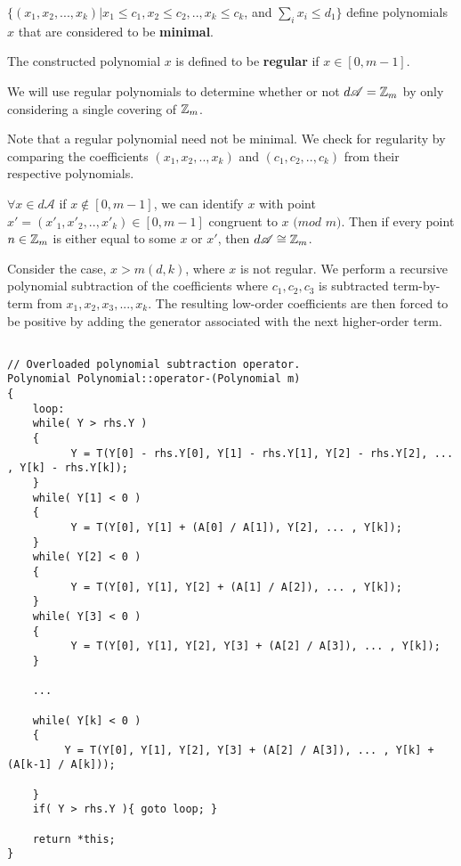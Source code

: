 \begin{proposition} 
$ \{ (x_1, x_2, ... , x_k) \vert x_{1} \leq c_1, x_{2} \leq c_2, .. , x_{k} \leq c_k$, and $\sum_{i} x_i \leq d_{1} \}$ define polynomials $x$ that are considered to be \textbf{minimal}.\n
\end{proposition}

\begin{proposition}
The constructed polynomial $x$ is defined to be \textbf{regular} if $x \in [0, m-1]$.
\end{proposition}
We will use regular polynomials to determine whether or not $d \mathscr{A} = \mbox{$\mathbb Z$}_m$ by only considering a single covering of $\mbox{$\mathbb Z$}_m$.\n

\noindent
Note that a regular polynomial need not be minimal.\n
\noindent
We check for regularity by comparing the coefficients $(x_1, x_2, .. , x_{k})$ and $(c_1, c_2, .. , c_k)$ from their respective polynomials.\n

\begin{proposition}
$\forall x \in d \mathscr{A}$ if $x \notin [0, m-1]$, we can identify $x$ with point $x' = (x'_1, x'_2, .. , x'_k) \in [0, m-1]$ congruent to $x$ $(mod$ $m)$.  Then if every point $n \in \mbox{$\mathbb Z$}_m$ is either equal to some $x$ or $x'$, then $d \mathscr{A} \cong \mbox{$\mathbb Z$}_m$.\n
\end{proposition}

\noindent
Consider the case, $x > m(d, k)$, where $x$ is not regular. We perform a recursive polynomial subtraction of the coefficients where $c_1, c_2, c_3$ is subtracted term-by-term from $x_1, x_2, x_3, ... , x_k$. The resulting low-order coefficients are then forced to be positive by adding the generator associated with the next higher-order term.\n

\begin{lstlisting}

// Overloaded polynomial subtraction operator.
Polynomial Polynomial::operator-(Polynomial m)
{
    loop:
    while( Y > rhs.Y )
    {
          Y = T(Y[0] - rhs.Y[0], Y[1] - rhs.Y[1], Y[2] - rhs.Y[2], ... , Y[k] - rhs.Y[k]);
    }
    while( Y[1] < 0 )
    {
          Y = T(Y[0], Y[1] + (A[0] / A[1]), Y[2], ... , Y[k]);
    }
    while( Y[2] < 0 )
    {
          Y = T(Y[0], Y[1], Y[2] + (A[1] / A[2]), ... , Y[k]);
    }
    while( Y[3] < 0 )
    {
          Y = T(Y[0], Y[1], Y[2], Y[3] + (A[2] / A[3]), ... , Y[k]);
    }

    ...

    while( Y[k] < 0 )
    {
         Y = T(Y[0], Y[1], Y[2], Y[3] + (A[2] / A[3]), ... , Y[k] + (A[k-1] / A[k]));

    }
    if( Y > rhs.Y ){ goto loop; } 

    return *this;
}
\end{lstlisting}

